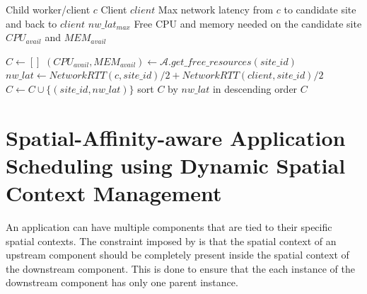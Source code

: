 \begin{algorithm}
\caption{$get\_candidate\_sites$}
\label{algo:get_candidate_sites}
\begin{algorithmic}[1]
\Require Child worker/client $c$
\Require Client $client$
\Require Max network latency from $c$ to candidate site and back to $client$ $nw\_lat_{max}$
\Require Free CPU and memory needed on the candidate site $CPU_{avail}$ and $MEM_{avail}$

\State $C \gets []$
    \State $\left( CPU_{avail}, MEM_{avail}\right) \gets \mathcal{A}.get\_free\_resources \left( site\_id \right)$
    \State $nw\_lat \gets NetworkRTT \left( c, site\_id\right)/2 + NetworkRTT \left( client, site\_id\right)/2$
        \State $C \gets C \cup \{ \left( site\_id, nw\_lat \right) \}$
    \EndIf
\EndFor
\State sort $C$ by $nw\_lat$ in descending order
\State \Return $C$

\end{algorithmic}
\end{algorithm}

\section{Spatial-Affinity-aware Application Scheduling using Dynamic Spatial Context Management}
\label{sec:oneedge_spatial_ctx}
An application can have multiple components that are tied to their specific spatial contexts. The constraint imposed by \oneedge{} is that the spatial context of an upstream component should be completely present inside the spatial context of the downstream component. This is done to ensure that the each instance of the downstream component has only one parent instance. 
